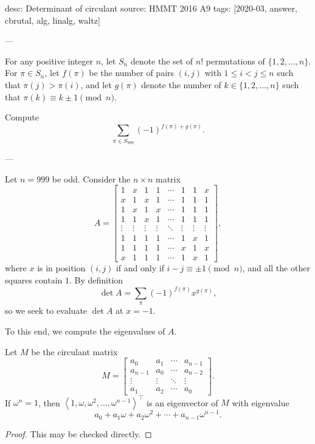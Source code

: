 desc: Determinant of circulant
source: HMMT 2016 A9
tags: [2020-03, answer, cbrutal, alg, linalg, waltz]

---

For any positive integer $n$, let $S_n$ denote the set of $n!$ permutations of $\{1,2,\ldots,n\}$. For $\pi\in S_n$, let $f(\pi)$ be the number of pairs $(i,j)$ with $1\le i<j\le n$ such that $\pi(j)>\pi(i)$, and let $g(\pi)$ denote the number of $k\in\{1,2,\ldots,n\}$ such that $\pi(k)\equiv k\pm1\pmod n$.

Compute \[\sum_{\pi\in S_{999}}(-1)^{f(\pi)+g(\pi)}.\]

---

Let $n=999$ be odd. Consider the $n\times n$ matrix \[A=\begin{bmatrix}
    1&x&1&1&\cdots&1&1&x\\
    x&1&x&1&\cdots&1&1&1\\
    1&x&1&x&\cdots&1&1&1\\
    1&1&x&1&\cdots&1&1&1\\
    \vdots&\vdots&\vdots&\vdots&\ddots&\vdots&\vdots&\vdots\\
    1&1&1&1&\cdots&1&x&1\\
    1&1&1&1&\cdots&x&1&x\\
    x&1&1&1&\cdots&1&x&1
\end{bmatrix},\]
where $x$ is in position $(i,j)$ if and only if $i-j\equiv\pm1\pmod n$, and all the other squares contain $1$. By definition \[\det A=\sum_\pi(-1)^{f(\pi)}x^{g(\pi)},\]
so we seek to evaluate $\det A$ at $x=-1$.

To this end, we compute the eigenvalues of $A$.
\begin{lemma*}
    Let $M$ be the circulant matrix \[M=\begin{bmatrix}
            a_0&a_1&\cdots&a_{n-1}\\
            a_{n-1}&a_0&\cdots&a_{n-2}\\
            \vdots&\vdots&\ddots&\vdots\\
            a_1&a_2&\cdots&a_0
    \end{bmatrix}.\]
    If $\omega^n=1$, then $\left<1,\omega,\omega^2,\ldots,\omega^{n-1}\right>^\top$ is an eigenvector of $M$ with eigenvalue \[a_0+a_1\omega+a_2\omega^2+\cdots+a_{n-1}\omega^{n-1}.\]
\end{lemma*}
\begin{proof}
    This may be checked directly.
\end{proof}

